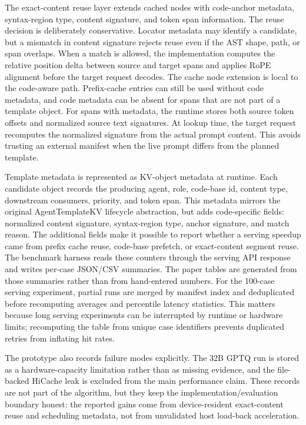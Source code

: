 The exact-content reuse layer extends cached nodes with code-anchor metadata, syntax-region type, content signature, and token span information.
The reuse decision is deliberately conservative.
Locator metadata may identify a candidate, but a mismatch in content signature rejects reuse even if the AST shape, path, or span overlaps.
When a match is allowed, the implementation computes the relative position delta between source and target spans and applies RoPE alignment before the target request decodes.
The cache node extension is local to the code-aware path.
Prefix-cache entries can still be used without code metadata, and code metadata can be absent for spans that are not part of a template object.
For spans with metadata, the runtime stores both source token offsets and normalized source text signatures.
At lookup time, the target request recomputes the normalized signature from the actual prompt content.
This avoids trusting an external manifest when the live prompt differs from the planned template.

Template metadata is represented as KV-object metadata at runtime.
Each candidate object records the producing agent, role, code-base id, content type, downstream consumers, priority, and token span.
This metadata mirrors the original AgentTemplateKV lifecycle abstraction, but \system adds code-specific fields: normalized content signature, syntax-region type, anchor signature, and match reason.
The additional fields make it possible to report whether a serving speedup came from prefix cache reuse, code-base prefetch, or exact-content segment reuse.
The benchmark harness reads these counters through the serving API response and writes per-case JSON/CSV summaries.
The paper tables are generated from those summaries rather than from hand-entered numbers.
For the 100-case serving experiment, partial runs are merged by manifest index and deduplicated before recomputing averages and percentile latency statistics.
This matters because long serving experiments can be interrupted by runtime or hardware limits; recomputing the table from unique case identifiers prevents duplicated retries from inflating hit rates.

The prototype also records failure modes explicitly.
The 32B GPTQ run is stored as a hardware-capacity limitation rather than as missing evidence, and the file-backed HiCache leak is excluded from the main performance claim.
These records are not part of the algorithm, but they keep the implementation/evaluation boundary honest: the reported gains come from device-resident exact-content reuse and scheduling metadata, not from unvalidated host load-back acceleration.
